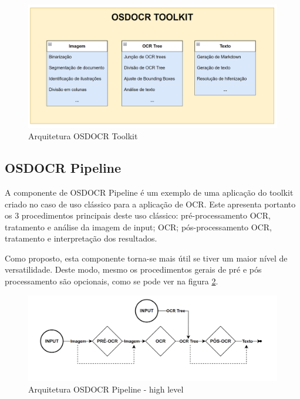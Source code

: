 \begin{figure}[H]
	\centering
	\includegraphics[width=1\textwidth]{images/diagramas/arquitetura_toolkit.png}
	\caption{Arquitetura OSDOCR Toolkit}
	\label{fig:arquitetura_toolkit}
\end{figure}


\subsection{OSDOCR Pipeline}

A componente de OSDOCR Pipeline é um exemplo de uma aplicação do toolkit criado no caso de uso clássico para a aplicação de OCR. Este apresenta portanto os 3 procedimentos principais deste uso clássico: pré-processamento OCR, tratamento e análise da imagem de input; OCR; pós-processamento OCR, tratamento e interpretação dos resultados.

Como proposto, esta componente torna-se mais útil se tiver um maior nível de versatilidade. Deste modo, mesmo os procedimentos gerais de pré e pós processamento são opcionais, como se pode ver na figura \ref{fig:arquitetura_pipeline_high_level}.

\begin{figure}[H]
	\centering
	\includegraphics[width=1\textwidth]{images/diagramas/arquitetura_pipeline_high_level.png}
	\caption{Arquitetura OSDOCR Pipeline - high level}
	\label{fig:arquitetura_pipeline_high_level}
\end{figure}

